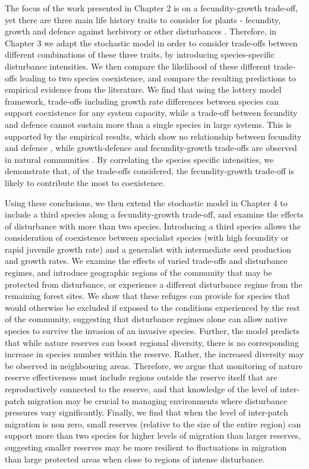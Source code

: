 The focus of the work presented in Chapter 2 is on a fecundity-growth trade-off, yet there are three main life history traits to consider for plants - fecundity, growth and defence against herbivory or other disturbances \citep{bazzaz1987allocating}. Therefore, in Chapter 3 we adapt the stochastic model in order to consider trade-offs between different combinations of these three traits, by introducing species-specific disturbance intensities. We then compare the likelihood of these different trade-offs leading to two species coexistence, and compare the resulting predictions to empirical evidence from the literature. We find that using the lottery model framework, trade-offs including growth rate differences between species can support coexistence for any system capacity, while a trade-off between fecundity and defence cannot sustain more than a single species in large systems. This is supported by the empirical results, which show no relationship between fecundity and defence \citep{martin2010divergence}, while growth-defence and fecundity-growth trade-offs are observed in natural communities \citep[e.g.][]{stanton2002competition,turnbull1999seed,wright2010functional,fine2006growth}. By correlating the species specific intensities, we demonstrate that, of the trade-offs considered, the fecundity-growth trade-off is likely to contribute the most to coexistence.

Using these conclusions, we then extend the stochastic model in Chapter 4 to include a third species along a fecundity-growth trade-off, and examine the effects of disturbance with more than two species. Introducing a third species allows the consideration of coexistence between specialist species (with high fecundity or rapid juvenile growth rate) and a generalist with intermediate seed production and growth rates. We examine the effects of varied trade-offs and disturbance regimes, and introduce geographic regions of the community that may be protected from disturbance, or experience a different disturbance regime from the remaining forest sites. We show that these refuges can provide for species that would otherwise be excluded if exposed to the conditions experienced by the rest of the community, suggesting that disturbance regimes alone can allow native species to survive the invasion of an invasive species. Further, the model predicts that while nature reserves can boost regional diversity, there is no corresponding increase in species number within the reserve. Rather, the increased diversity may be observed in neighbouring areas. Therefore, we argue that monitoring of nature reserve effectiveness must include regions outside the reserve itself that are reproductively connected to the reserve, and that knowledge of the level of inter-patch migration may be crucial to managing environments where disturbance pressures vary significantly. Finally, we find that when the level of inter-patch migration is non zero, small reserves (relative to the size of the entire region) can support more than two species for higher levels of migration than larger reserves, suggesting smaller reserves may be more resilient to fluctuations in migration than large protected areas when close to regions of intense disturbance.